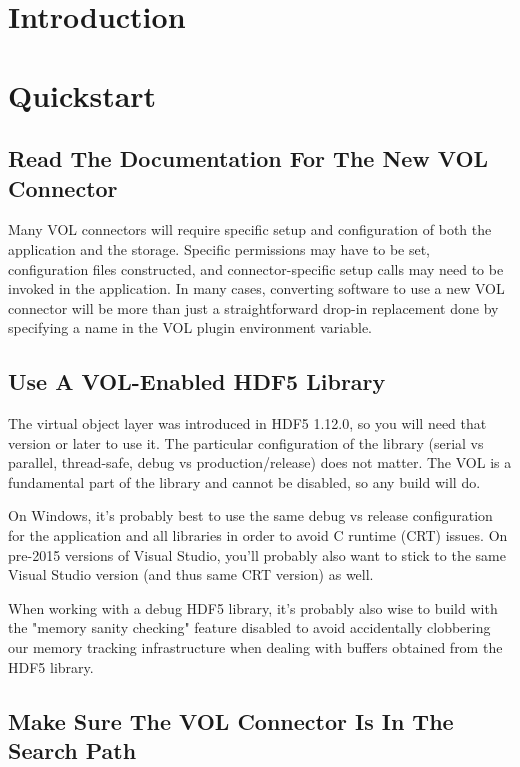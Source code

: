 

\section{Introduction}

\section{Quickstart}

\subsection*{Read The Documentation For The New VOL Connector}

Many VOL connectors will require specific setup and configuration of both the application and the storage. Specific permissions may have to be set, configuration files constructed, and connector-specific setup calls may need to be invoked in the application. In many cases, converting software to use a new VOL connector will be more than just a straightforward drop-in replacement done by specifying a name in the VOL plugin environment variable.

\subsection*{Use A VOL-Enabled HDF5 Library}

The virtual object layer was introduced in HDF5 1.12.0, so you will need that version or later to use it. The particular configuration of the library (serial vs parallel, thread-safe, debug vs production/release) does not matter. The VOL is a fundamental part of the library and cannot be disabled, so any build will do.

On Windows, it's probably best to use the same debug vs release configuration for the application and all libraries in order to avoid C runtime (CRT) issues. On pre-2015 versions of Visual Studio, you'll probably also want to stick to the same Visual Studio version (and thus same CRT version) as well.

When working with a debug HDF5 library, it's probably also wise to build with the "memory sanity checking" feature disabled to avoid accidentally clobbering our memory tracking infrastructure when dealing with buffers obtained from the HDF5 library.

\subsection*{Make Sure The VOL Connector Is In The Search Path}

